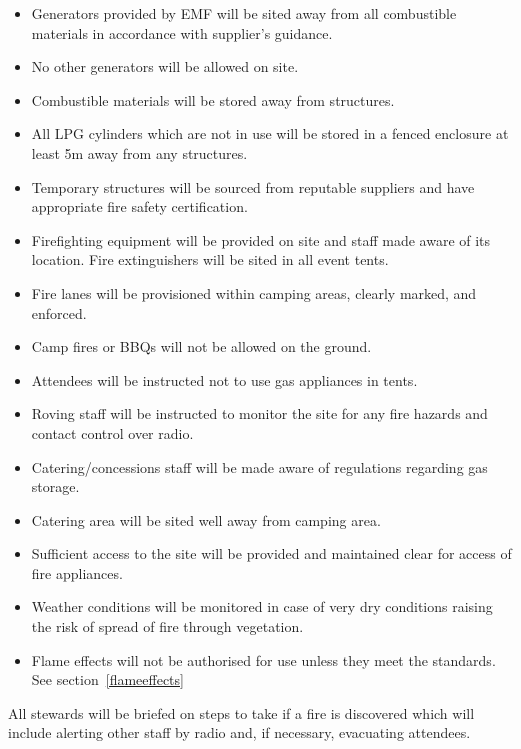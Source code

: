 \begin{itemize}
\item Generators provided by EMF will be sited away from all combustible materials in accordance with supplier's guidance.
\item No other generators will be allowed on site.
\item Combustible materials will be stored away from structures.
\item All LPG cylinders which are not in use will be stored in a fenced enclosure at least 5m away from any structures.
\item Temporary structures will be sourced from reputable suppliers and have appropriate fire safety certification.
\item Firefighting equipment will be provided on site and staff made aware of its location. Fire extinguishers will be sited in all event tents.
\item Fire lanes will be provisioned within camping areas, clearly marked, and enforced.
\item Camp fires or BBQs will not be allowed on the ground.
\item Attendees will be instructed not to use gas appliances in tents.
\item Roving staff will be instructed to monitor the site for any fire hazards and contact control over radio.
\item Catering/concessions staff will be made aware of regulations regarding gas storage.
\item Catering area will be sited well away from camping area.
\item Sufficient access to the site will be provided and maintained clear for access of fire appliances.
\item Weather conditions will be monitored in case of very dry conditions raising the risk of spread of fire through vegetation.
\item Flame effects will not be authorised for use unless they meet the standards. See section~\ref{flameeffects}
\end{itemize}

All stewards will be briefed on steps to take if a fire is discovered which
will include alerting other staff by radio and, if necessary, evacuating
attendees.


